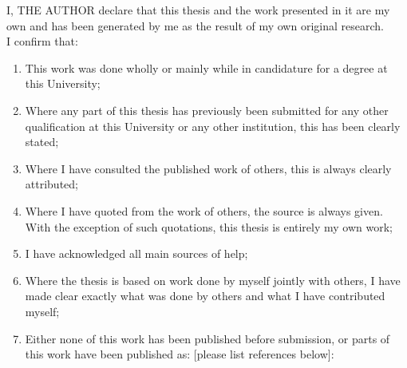 \thispagestyle{empty}


\vfill

I, THE AUTHOR declare that this thesis and the work presented in it are my own and has been generated by me as the result of my own original research.\\

I confirm that:

\begin{enumerate}
	\item This work was done wholly or mainly while in candidature for a degree at this University; 
	\item Where any part of this thesis has previously been submitted for any other qualification at this University or any other institution, this has been clearly stated; 
	\item Where I have consulted the published work of others, this is always clearly attributed; 
	\item Where I have quoted from the work of others, the source is always given. With the exception of such quotations, this thesis is entirely my own work; 
	\item I have acknowledged all main sources of help; 
	\item Where the thesis is based on work done by myself jointly with others, I have made clear exactly what was done by others and what I have contributed myself; 
	\item Either none of this work has been published before submission, or parts of this work have been published as: [please list references below]:
\end{enumerate}

\vfill